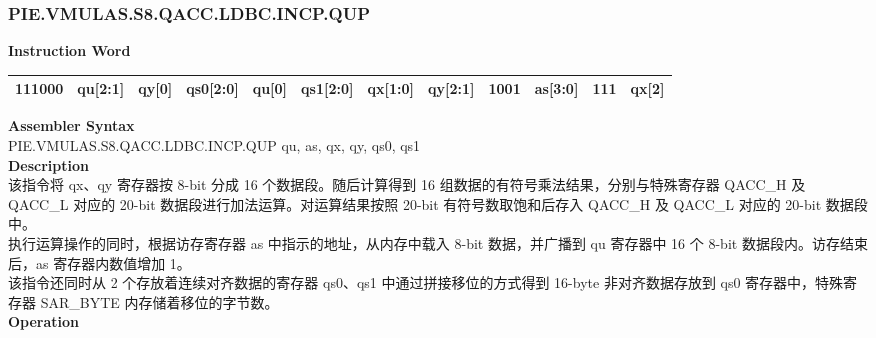 \newpage
\subsubsection{PIE.VMULAS.S8.QACC.LDBC.INCP.QUP}\label{instruction:PIEVMULASS8QACCLDBCINCPQUP}
\setlength\tabcolsep{6pt}
\textbf{Instruction Word} \\
\begin{tabular}{|c|c|c|c|c|c|c|c|c|c|c|c|}
	\hline
	111000 & qu[2:1] & qy[0] & qs0[2:0] & qu[0] & qs1[2:0] & qx[1:0] & qy[2:1] & 1001 & as[3:0] & 111 & qx[2] \\
	\hline
\end{tabular}

\textbf{Assembler Syntax} \\
PIE.VMULAS.S8.QACC.LDBC.INCP.QUP qu, as, qx, qy, qs0, qs1 \\
\textbf{Description} \\
该指令将 qx、qy 寄存器按 8-bit 分成 16 个数据段。随后计算得到 16 组数据的有符号乘法结果，分别与特殊寄存器 QACC\_H 及 QACC\_L 对应的 20-bit 数据段进行加法运算。对运算结果按照 20-bit 有符号数取饱和后存入 QACC\_H 及 QACC\_L 对应的 20-bit 数据段中。\\
执行运算操作的同时，根据访存寄存器 as 中指示的地址，从内存中载入 8-bit 数据，并广播到 qu 寄存器中 16 个 8-bit 数据段内。访存结束后，as 寄存器内数值增加 1。\\
该指令还同时从 2 个存放着连续对齐数据的寄存器 qs0、qs1 中通过拼接移位的方式得到 16-byte 非对齐数据存放到 qs0 寄存器中，特殊寄存器 SAR\_BYTE 内存储着移位的字节数。\\
\textbf{Operation}
